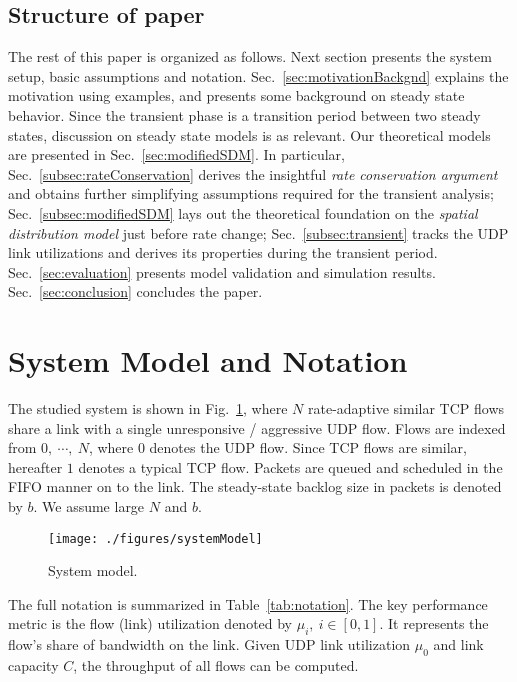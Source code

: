 \documentclass{IEEEtran}
\begin{document}
    \subsection{Structure of paper}
    The rest of this paper is organized as follows. Next section presents the system setup, basic assumptions and notation. Sec.~\ref{sec:motivationBackgnd} explains the motivation using examples, and presents some background on steady state behavior. Since the transient phase is a transition period between two steady states, discussion on steady state models is as relevant. Our theoretical models are presented in Sec.~\ref{sec:modifiedSDM}. In particular, Sec.~\ref{subsec:rateConservation} derives the insightful \emph{rate conservation argument} and obtains  further simplifying assumptions required for the transient analysis; Sec.~\ref{subsec:modifiedSDM} lays out the theoretical foundation on the \emph{spatial distribution model} just before rate change; Sec.~\ref{subsec:transient} tracks the UDP link utilizations and derives its properties during the transient period. Sec.~\ref{sec:evaluation} presents model validation and simulation results. Sec.~\ref{sec:conclusion} concludes the paper.

\section{System Model and Notation} \label{sec:modelAssumptionNotation}
    The studied system is shown in Fig.~\ref{fig:sysModel}, where $N$ rate-adaptive similar TCP flows share a link with a single unresponsive / aggressive UDP flow. Flows are indexed from $0,~\cdots,~N$, where $0$ denotes the UDP flow. Since TCP flows are similar, hereafter $1$ denotes a typical TCP flow. Packets are queued and scheduled in the FIFO manner on to the link. The steady-state backlog size in packets is denoted by $b$.  We assume large $N$ and $b$.
        \begin{figure}[h]
            \centering
            \texttt{[image: ./figures/systemModel]}\caption{System model.}
            \label{fig:sysModel}
        \end{figure}

 The full notation is summarized in Table~\ref{tab:notation}. The key performance metric is the flow (link) utilization denoted by $\mu_i,~i\in[0,1]$. It represents the flow's share of bandwidth on the link. Given UDP link utilization $\mu_0$ and link capacity $C$,  the throughput of all flows  can be computed.
\end{document}
